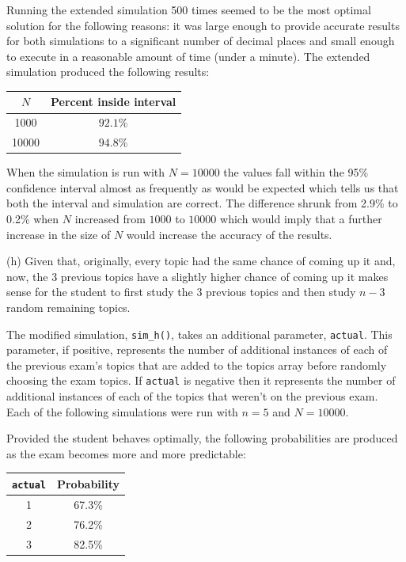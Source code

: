 \documentclass[10pt]{article}
\begin{document}
Running the extended simulation 500 times seemed to be the most optimal solution for the following reasons: it was large enough to provide accurate results for both simulations to a significant number of decimal places and small enough to execute in a reasonable amount of time (under a minute). The extended simulation produced the following results:

\begin{center}
    \begin{tabular}{|c|c|}
        \hline
        $N$ & Percent inside interval \\ \hline
        1000 & $92.1\%$ \\ \hline
        10000 & $94.8\%$ \\ \hline
    \end{tabular}
\end{center}

When the simulation is run with $N = 10000$ the values fall within the 95\% confidence interval almost as frequently as would be expected which tells us that both the interval and simulation are correct. The difference shrunk from 2.9\% to 0.2\% when $N$ increased from $1000$ to $10000$ which would imply that a further increase in the size of $N$ would increase the accuracy of the results.

\noindent (h) Given that, originally, every topic had the same chance of coming up it and, now, the 3 previous topics have a slightly higher chance of coming up it makes sense for the student to first study the 3 previous topics and then study $n - 3$ random remaining topics.

The modified simulation, \texttt{sim\_h()}, takes an additional parameter, \texttt{actual}. This parameter, if positive, represents the number of additional instances of each of the previous exam's topics that are added to the topics array before randomly choosing the exam topics. If \texttt{actual} is negative then it represents the number of additional instances of each of the topics that weren't on the previous exam. Each of the following simulations were run with $n = 5$ and $N = 10000$.

Provided the student behaves optimally, the following probabilities are produced as the exam becomes more and more predictable:

\begin{center}
    \begin{tabular}{|c|c|}
        \hline
        \texttt{actual} & Probability \\ \hline
        1 & 67.3\% \\ \hline
        2 & 76.2\% \\ \hline
        3 & 82.5\% \\ \hline
    \end{tabular}
\end{center}
\end{document}
